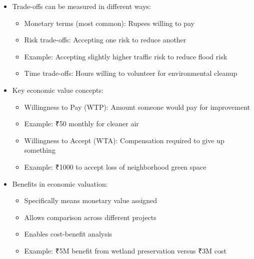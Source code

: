 \documentclass[
  ignorenonframetext,
]{beamer}
\providecommand{\tightlist}{%
  \setlength{\itemsep}{0pt}\setlength{\parskip}{0pt}}\usepackage{longtable,booktabs,array}
\begin{document}
\begin{frame}
\begin{itemize}
\tightlist
\item
  Trade-offs can be measured in different ways:

  \begin{itemize}
  \tightlist
  \item
    Monetary terms (most common): Rupees willing to pay
  \item
    Risk trade-offs: Accepting one risk to reduce another
  \item
    Example: Accepting slightly higher traffic risk to reduce flood risk
  \item
    Time trade-offs: Hours willing to volunteer for environmental
    cleanup
  \end{itemize}
\item
  Key economic value concepts:

  \begin{itemize}
  \tightlist
  \item
    Willingness to Pay (WTP): Amount someone would pay for improvement
  \item
    Example: ₹50 monthly for cleaner air
  \item
    Willingness to Accept (WTA): Compensation required to give up
    something
  \item
    Example: ₹1000 to accept loss of neighborhood green space
  \end{itemize}
\item
  Benefits in economic valuation:

  \begin{itemize}
  \tightlist
  \item
    Specifically means monetary value assigned
  \item
    Allows comparison across different projects
  \item
    Enables cost-benefit analysis
  \item
    Example: ₹5M benefit from wetland preservation versus ₹3M cost
  \end{itemize}
\end{itemize}
\end{frame}

\begin{frame}
\end{frame}
\end{document}
